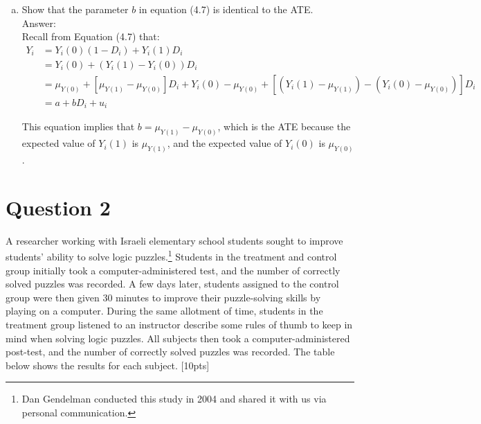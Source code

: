 \documentclass[11pt,notitlepage]{article}\usepackage[]{graphicx}\usepackage[]{color}
\begin{document}
\begin{enumerate}[a)]
\item Show that the parameter $b$ in equation (4.7) is identical to the ATE.\\
Answer:\\
Recall from Equation (4.7) that:
\begin{align*}
Y_i & =Y_i (0)(1-D_i )+Y_i (1) D_i\\
&=Y_i (0)+(Y_i (1)-Y_i (0) )D_i\\
&= \mu_{Y(0)}+[\mu_{Y(1)}-\mu_{Y(0)} ] D_i+Y_i (0)-\mu_{Y(0)}+[(Y_i (1)-\mu_{Y(1)} )-(Y_i (0)-\mu_{Y(0)} )] D_i\\
&= a+bD_i+u_i
\end{align*}

This equation implies that $b=\mu_{Y(1)}-\mu_{Y(0)}$, which is the ATE because the expected value of $Y_i (1)$ is $\mu_{Y(1)}$, and the expected value of $Y_i (0)$ is $\mu_{Y(0)}$.

\end{enumerate}

\section*{Question 2}

A researcher working with Israeli elementary school students sought to improve students' ability to solve logic puzzles.\footnote{Dan Gendelman conducted this study in 2004 and shared it with us via personal communication.} Students in the treatment and control group initially took a computer-administered test, and the number of correctly solved puzzles was recorded. A few days later, students assigned to the control group were then given 30 minutes to improve their puzzle-solving skills by playing on a computer. During the same allotment of time, students in the treatment group listened to an instructor describe some rules of thumb to keep in mind when solving logic puzzles. All subjects then took a computer-administered post-test, and the number of correctly solved puzzles was recorded. The table below shows the results for each subject. [10pts]
\end{document}
